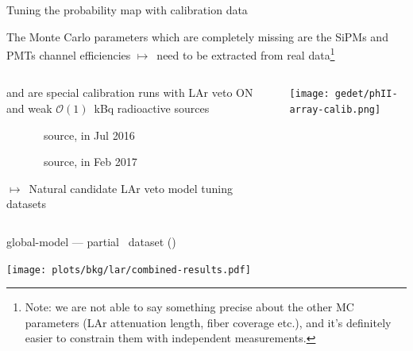\documentclass[10pt,aspectratio=169]{beamer}
\newcommand{\arrow}{$\longmapsto$}
\begin{document}
\begin{frame}{Tuning the probability map with calibration data}
  \begin{simpleblock}
    The Monte Carlo parameters which are completely missing are the SiPMs and
    PMTs \alert{channel efficiencies} \arrow\ need to be extracted from real
    data\footnote{Note: we are not able to say something precise about the
    other MC parameters (LAr attenuation length, fiber coverage etc.), and it's
    definitely easier to constrain them with independent measurements.}
  \end{simpleblock}

  \vspace*{0.5cm}
  \begin{columns}
    \begin{column}{0.7\textwidth}\setlength{\parskip}{10pt}%
       and  are special calibration runs with LAr veto ON and
      weak $\mathcal{O}(1)$~kBq radioactive sources
      \begin{description}
        \item[] \Th\ source, in Jul 2016
        \item[] \Ra\ source, in Feb 2017
      \end{description}

      \alert{\arrow\ Natural candidate LAr veto model tuning datasets}
    \end{column}
    \begin{column}{0.25\textwidth}
      \hspace{-0.5cm}\texttt{[image: gedet/phII-array-calib.png]}
    \end{column}
  \end{columns}
\end{frame}
\begin{frame}[plain]{global-model --- partial \phasetwo\ dataset (\gexpophasetwobkg)}
  \begin{center}
    \texttt{[image: plots/bkg/lar/combined-results.pdf]}
  \end{center}
\end{frame}
\end{document}
